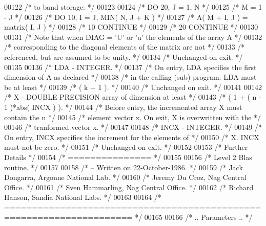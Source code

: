 \begin{DoxyCode}
00122 \textcolor{comment}{/*           to band storage: */}
00123 
00124 \textcolor{comment}{/*                 DO 20, J = 1, N */}
00125 \textcolor{comment}{/*                    M = 1 - J */}
00126 \textcolor{comment}{/*                    DO 10, I = J, MIN( N, J + K ) */}
00127 \textcolor{comment}{/*                       A( M + I, J ) = matrix( I, J ) */}
00128 \textcolor{comment}{/*              10    CONTINUE */}
00129 \textcolor{comment}{/*              20 CONTINUE */}
00130 
00131 \textcolor{comment}{/*           Note that when DIAG = 'U' or 'u' the elements of the array A */}
00132 \textcolor{comment}{/*           corresponding to the diagonal elements of the matrix are not */}
00133 \textcolor{comment}{/*           referenced, but are assumed to be unity. */}
00134 \textcolor{comment}{/*           Unchanged on exit. */}
00135 
00136 \textcolor{comment}{/*  LDA    - INTEGER. */}
00137 \textcolor{comment}{/*           On entry, LDA specifies the first dimension of A as declared */}
00138 \textcolor{comment}{/*           in the calling (sub) program. LDA must be at least */}
00139 \textcolor{comment}{/*           ( k + 1 ). */}
00140 \textcolor{comment}{/*           Unchanged on exit. */}
00141 
00142 \textcolor{comment}{/*  X      - DOUBLE PRECISION array of dimension at least */}
00143 \textcolor{comment}{/*           ( 1 + ( n - 1 )*abs( INCX ) ). */}
00144 \textcolor{comment}{/*           Before entry, the incremented array X must contain the n */}
00145 \textcolor{comment}{/*           element vector x. On exit, X is overwritten with the */}
00146 \textcolor{comment}{/*           tranformed vector x. */}
00147 
00148 \textcolor{comment}{/*  INCX   - INTEGER. */}
00149 \textcolor{comment}{/*           On entry, INCX specifies the increment for the elements of */}
00150 \textcolor{comment}{/*           X. INCX must not be zero. */}
00151 \textcolor{comment}{/*           Unchanged on exit. */}
00152 
00153 \textcolor{comment}{/*  Further Details */}
00154 \textcolor{comment}{/*  =============== */}
00155 
00156 \textcolor{comment}{/*  Level 2 Blas routine. */}
00157 
00158 \textcolor{comment}{/*  -- Written on 22-October-1986. */}
00159 \textcolor{comment}{/*     Jack Dongarra, Argonne National Lab. */}
00160 \textcolor{comment}{/*     Jeremy Du Croz, Nag Central Office. */}
00161 \textcolor{comment}{/*     Sven Hammarling, Nag Central Office. */}
00162 \textcolor{comment}{/*     Richard Hanson, Sandia National Labs. */}
00163 
00164 \textcolor{comment}{/*  ===================================================================== */}
00165 
00166 \textcolor{comment}{/*     .. Parameters .. */}

\end{DoxyCode}
